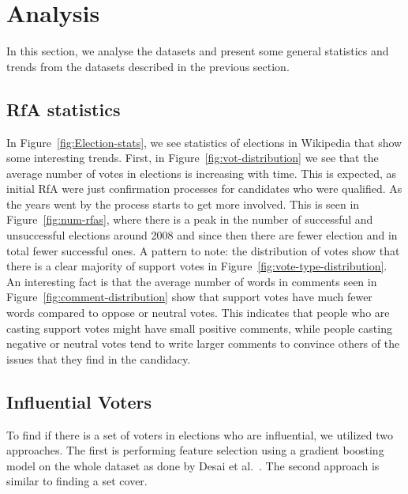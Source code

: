 \section{Analysis}
In this section, we analyse the datasets and present some general statistics and trends from the datasets described in the previous section.

\subsection{RfA statistics}
\label{sec:rfa-statistics}
In Figure~\ref{fig:Election-stats}, we see statistics of elections in Wikipedia that show some interesting trends. First, in Figure~\ref{fig:vot-distribution} we see that the average number of votes in elections is increasing with time. This is expected, as initial RfA were just confirmation processes for candidates who were qualified. As the years went by the process starts to get more involved. This is seen in Figure~\ref{fig:num-rfas}, where there is a peak in the number of successful and unsuccessful elections around 2008 and since then there are fewer election and in total fewer successful ones. A pattern to note: the distribution of votes show that there is a clear majority of support votes in Figure~\ref{fig:vote-type-distribution}. An interesting fact is that the average number of words in comments seen in Figure~\ref{fig:comment-distribution} show that support votes have much fewer words compared to oppose or neutral votes. This indicates that people who are casting support votes might have small positive comments, while people casting negative or neutral votes tend to write larger comments to convince others of the issues that they find in the candidacy.

\subsection{Influential Voters}
\label{sec:influential-voters}
To find if there is a set of voters in elections who are influential, we utilized two approaches. The first is performing feature selection using a gradient boosting model on the whole dataset as done by Desai et al.\ \cite{desai2014result}. The second approach is similar to finding a set cover.

